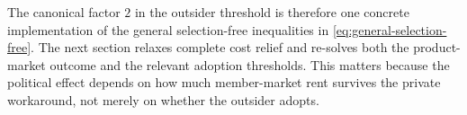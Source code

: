 

The canonical factor $2$ in the outsider threshold is therefore one concrete implementation of the general selection-free inequalities in \eqref{eq:general-selection-free}. The next section relaxes complete cost relief and re-solves both the product-market outcome and the relevant adoption thresholds. This matters because the political effect depends on how much member-market rent survives the private workaround, not merely on whether the outsider adopts.
